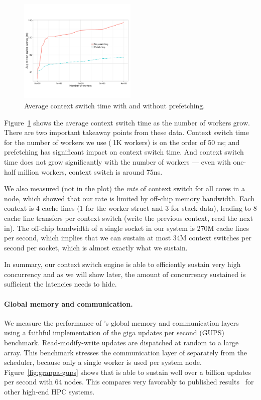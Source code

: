 \begin{figure}[ht]
    \begin{center}
      \includegraphics[width=0.5\textwidth]{figs/context_switch_time.pdf}
    \end{center}
    \caption{Average context switch time with and without prefetching.}
    \label{fig:context-switch-exp}
\end{figure}

Figure~\ref{fig:context-switch-exp} shows the average context switch time as
the number of workers grow. There are two important takeaway points from these
data. Context switch time for the number of workers we use ($~$1K workers) is
on the order of 50 ns; and prefetching has significant impact on context
switch time. And context switch time does not grow significantly with the
number of workers --- even with one-half million workers, context switch
is around 75ns.

We also measured (not in the plot) the \emph{rate} of context switch for all
cores in a node, which showed that our rate is limited by off-chip memory
bandwidth. Each context is 4 cache lines (1 for the worker struct and 3 for
stack data), leading to 8 cache line transfers per context switch
(write the previous context, read the next in). The off-chip bandwidth of a
single socket in our system is 270M cache lines per second, which implies that
we can sustain at most 34M context switches per second per socket, which is
almost exactly what we sustain.

In summary, our context switch engine is able to efficiently sustain very high
concurrency and as we will show later, the amount of concurrency sustained is
sufficient the latencies \Grappa needs to hide.

\paragraph{Global memory and communication.} We measure the performance of
\Grappa's global memory and communication layers using a faithful
implementation of the giga updates per second (GUPS) benchmark.
Read-modify-write updates are dispatched at random to a large array. This
benchmark stresses the communication layer of \Grappa separately from the
scheduler, because only a single worker is used per system node.
Figure~\ref{fig:grappa-gups} shows that \Grappa is able to sustain well over a
billion updates per second with 64 nodes. This compares very favorably to
published results~\cite{gups} for other high-end HPC systems.



